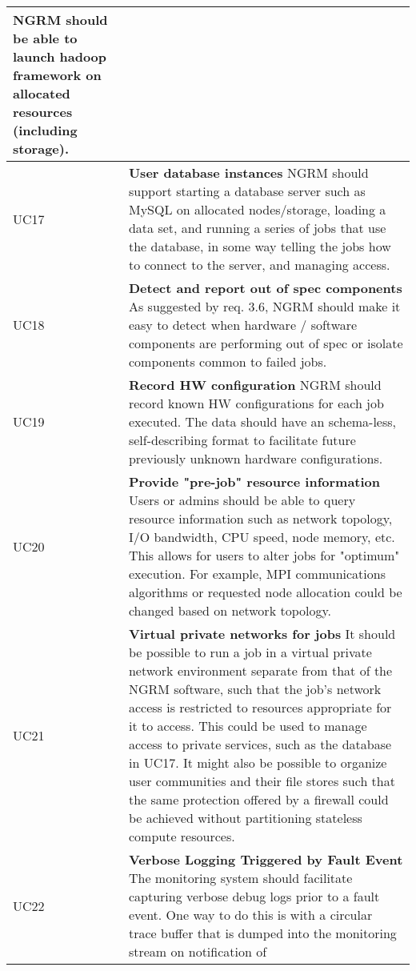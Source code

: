 \begin{longtable}{|p{1cm}|p{15cm}|}
	NGRM should be able to launch hadoop framework on allocated resources
	(including storage).\\
  \hline
  UC17 & \textbf{User database instances}\newline
	NGRM should support starting a database server such as MySQL on
	allocated nodes/storage, loading a data set, and running a series of
	jobs that use the database, in some way telling the jobs how to
	connect to the server, and managing access.\\
  \hline
  UC18 & \textbf{Detect and report out of spec components}\newline
	As suggested by req. 3.6, NGRM should make it easy to detect when
	hardware / software components are performing out of spec or isolate
	components common to failed jobs.\\
  \hline
  UC19 & \textbf{Record HW configuration}\newline
	NGRM should record known HW configurations for each job executed.
	The data should have an schema-less, self-describing format to
	facilitate future previously unknown hardware configurations.\\
  \hline
  UC20 & \textbf{Provide "pre-job" resource information}\newline
	Users or admins should be able to query resource information such as
	network topology, I/O bandwidth, CPU speed, node memory, etc.
	This allows for users to alter jobs for "optimum" execution.
	For example, MPI communications algorithms or requested node
	allocation could be changed based on network topology.\\
  \hline
  UC21 & \textbf{Virtual private networks for jobs}\newline
	It should be possible to run a job in a virtual private network
	environment separate from that of the NGRM software, such that the
	job's network access is restricted to resources appropriate for it
	to access. This could be used to manage access to private services,
	such as the database in UC17. It might also be possible to organize
	user communities and their file stores such that the same protection
	offered by a firewall could be achieved without partitioning stateless
	compute resources.\\
  \hline
  UC22 & \textbf{Verbose Logging Triggered by Fault Event}\newline
	The monitoring system should facilitate capturing verbose debug logs
	prior to a fault event. One way to do this is with a circular trace
	buffer that is dumped into the monitoring stream on notification of

\end{longtable}
